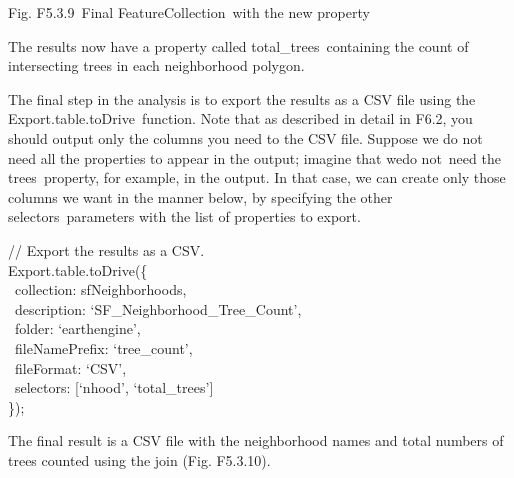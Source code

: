 \documentclass[
  letterpaper,
  DIV=11,
  numbers=noendperiod]{scrreprt}
\begin{document}
Fig. F5.3.9~Final FeatureCollection~with the new property

The results now have a property called total\_trees~containing the count
of intersecting trees in each neighborhood polygon.

The final step in the analysis is to export the results as a CSV file
using the Export.table.toDrive~function. Note that as described in
detail in F6.2, you should output only the columns you need to the CSV
file. Suppose we do not need all the properties to appear in the output;
imagine that wedo not~need the trees~property, for example, in the
output. In that case, we can create only those columns we want in the
manner below, by specifying the other selectors~parameters with the list
of properties to export.

// Export the results as a CSV.\\
Export.table.toDrive(\{\\
\hspace*{0.333em} ~collection: sfNeighborhoods,\\
\hspace*{0.333em} ~description: `SF\_Neighborhood\_Tree\_Count',\\
\hspace*{0.333em} ~folder: `earthengine',\\
\hspace*{0.333em} ~fileNamePrefix: `tree\_count',\\
\hspace*{0.333em} ~fileFormat: `CSV',\\
\hspace*{0.333em} ~selectors: {[}`nhood', `total\_trees'{]}\\
\});

The final result is a CSV file with the neighborhood names and total
numbers of trees counted using the join (Fig. F5.3.10).
\end{document}
